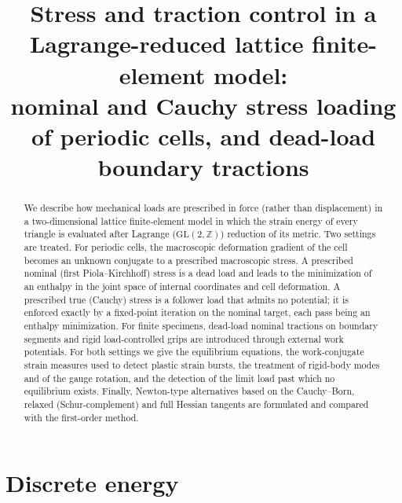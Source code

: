 \documentclass[11pt,a4paper]{article}
\title{Stress and traction control in a Lagrange-reduced lattice finite-element model:\\
nominal and Cauchy stress loading of periodic cells, and dead-load boundary tractions}
\date{}
\begin{document}
\maketitle

\begin{abstract}
We describe how mechanical loads are prescribed in force (rather than displacement) in a
two-dimensional lattice finite-element model in which the strain energy of every triangle is
evaluated after Lagrange (\(\mathrm{GL}(2,\mathbb Z)\)) reduction of its metric. Two settings are
treated. For periodic cells, the macroscopic deformation gradient of the cell becomes an unknown
conjugate to a prescribed macroscopic stress. A prescribed nominal (first Piola--Kirchhoff) stress
is a dead load and leads to the minimization of an enthalpy in the joint space of internal
coordinates and cell deformation. A prescribed true (Cauchy) stress is a follower load that admits
no potential; it is enforced exactly by a fixed-point iteration on the nominal target, each pass
being an enthalpy minimization. For finite specimens, dead-load nominal tractions on boundary
segments and rigid load-controlled grips are introduced through external work potentials. For both
settings we give the equilibrium equations, the work-conjugate strain measures used to detect
plastic strain bursts, the treatment of rigid-body modes and of the gauge rotation, and the
detection of the limit load past which no equilibrium exists. Finally, Newton-type alternatives
based on the Cauchy--Born, relaxed (Schur-complement) and full Hessian tangents are formulated and
compared with the first-order method.
\end{abstract}

\section{Discrete energy}
\label{sec:energy}
\end{document}
